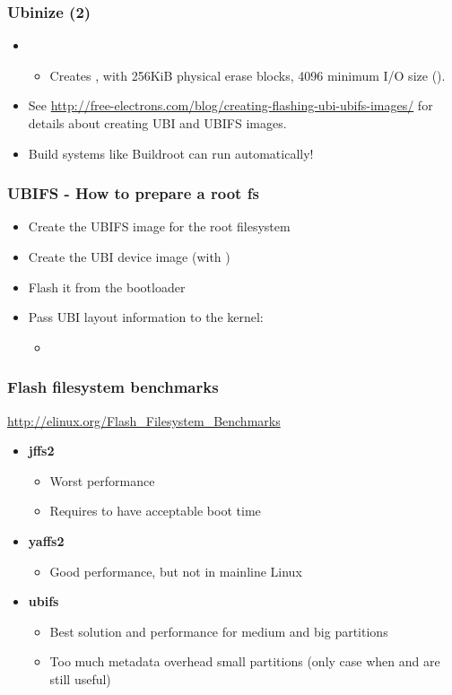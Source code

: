 \begin{frame}
  \frametitle{Ubinize (2)}
  \begin{itemize}
  \item {}
  \begin{itemize}
    \item Creates , with 256KiB physical erase blocks,
      4096 minimum I/O size ().
    \end{itemize}
  \item See
    \url{http://free-electrons.com/blog/creating-flashing-ubi-ubifs-images/}
    for details about creating UBI and UBIFS images.
  \item Build systems like Buildroot can run  automatically!
  \end{itemize}
\end{frame}

\begin{frame}
  \frametitle{UBIFS - How to prepare a root fs}
  \begin{itemize}
  \item Create the UBIFS image for the root filesystem
  \item Create the UBI device image (with )
  \item Flash it from the bootloader
  \item Pass UBI layout information to the kernel:
    \begin{itemize}
    \item {}
    \end{itemize}
  \end{itemize}
\end{frame}

\begin{frame}
  \frametitle{Flash filesystem benchmarks}
  \url{http://elinux.org/Flash_Filesystem_Benchmarks}
  \begin{itemize}
  \item {\bf jffs2}
    \begin{itemize}
    \item Worst performance
    \item Requires  to have acceptable boot time
    \end{itemize}
  \item {\bf yaffs2}
    \begin{itemize}
    \item Good performance, but not in mainline Linux
    \end{itemize}
  \item {\bf ubifs}
    \begin{itemize}
    \item Best solution and performance for medium and big
      partitions
    \item Too much metadata overhead small partitions (only case
      when  and  are still useful)
    \end{itemize}
  \end{itemize}
\end{frame}

